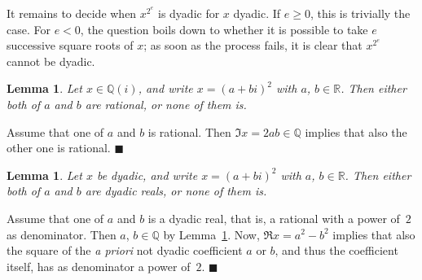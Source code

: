 \documentclass [11pt]{article}
\newcommand {\Q}{\mathbb Q}
\newcommand {\R}{\mathbb R}
\renewcommand {\geq}{\geqslant}
\newtheorem{lemma}[theorem]{Lemma}
\newenvironment{proof}{\noindent{\bf Proof:}}{{\hspace* {\fill}$\blacksquare$}}
\begin{document}
It remains to decide when $x^{2^e}$ is dyadic for $x$ dyadic. If $e \geq 0$,
this is trivially the case. For $e < 0$, the question boils down to whether
it is possible to take $e$ successive square roots of $x$; as soon as the
process fails, it is clear that $x^{2^e}$ cannot be dyadic.

\begin{lemma}
\label {lm:sqrtrat}
Let $x \in \Q (i)$, and write $x = (a + b i)^2$ with $a$, $b \in \R$.
Then either both of $a$ and $b$ are rational, or none of them is.
\end{lemma}

\begin{proof}
Assume that one of $a$ and $b$ is rational. Then $\Im x = 2 a b \in \Q$
implies that also the other one is rational.
\end{proof}

\begin{lemma}
Let $x$ be dyadic, and write $x = (a + b i)^2$ with $a$, $b \in \R$.
Then either both of $a$ and $b$ are dyadic reals, or none of them is.
\end{lemma}

\begin{proof}
Assume that one of $a$ and $b$ is a dyadic real, that is, a rational with
a power of~$2$ as denominator. Then $a$, $b \in \Q$ by Lemma~\ref {lm:sqrtrat}.
Now, $\Re x = a^2 - b^2$ implies that also the square of the \textit {a priori}
not dyadic coefficient $a$ or $b$, and thus the coefficient itself,
has as denominator a power of~$2$.
\end{proof}
\end{document}
